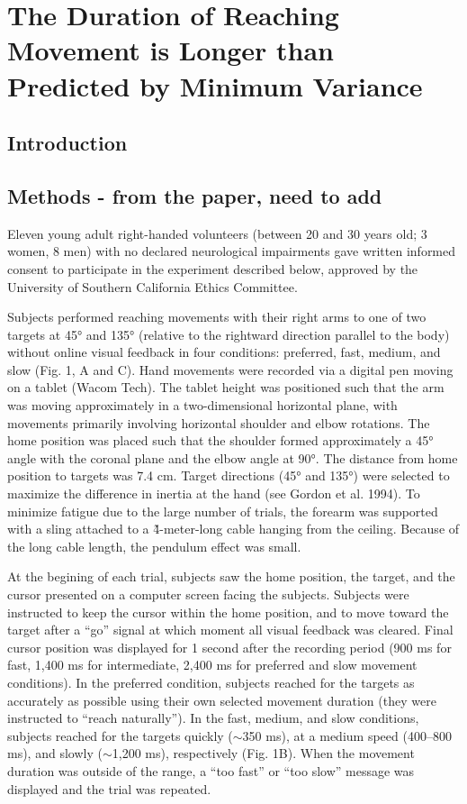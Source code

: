 \chapter{The Duration of Reaching Movement is Longer than Predicted by Minimum Variance}
\label{cha:md}

\section{Introduction}

\section{Methods - from the paper, need to add}
Eleven young adult right-handed volunteers (between 20 and 30 years old; 3 women, 8 men) with no declared neurological impairments gave written informed consent to participate in the experiment described below, approved by the University of Southern California Ethics Committee.

Subjects performed reaching movements with their right arms to one of two targets at 45° and 135° (relative to the rightward direction parallel to the body) without online visual feedback in four conditions: preferred, fast, medium, and slow (Fig. 1, A and C).  
Hand movements were recorded via a digital pen moving on a tablet (Wacom Tech). 
The tablet height was positioned such that the arm was moving approximately in a two-dimensional horizontal plane, with movements primarily involving horizontal shoulder and elbow rotations. 
The home position was placed such that the shoulder formed approximately a 45° angle with the coronal plane and the elbow angle at 90°. 
The distance from home position to targets was 7.4 cm. 
Target directions (45° and 135°) were selected to maximize the difference in inertia at the hand (see Gordon et al. 1994). 
To minimize fatigue due to the large number of trials, the forearm was supported with a sling attached to a \~4-meter-long cable hanging from the ceiling. 
Because of the long cable length, the pendulum effect was small.

At the begining of each trial, subjects saw the home position, the target, and the cursor presented on a computer screen facing the subjects. 
Subjects were instructed to keep the cursor within the home position, and to move toward the target after a “go” signal at which moment all visual feedback was cleared. 
Final cursor position was displayed for 1 second after the recording period (900 ms for fast, 1,400 ms for intermediate, 2,400 ms for preferred and slow movement conditions). 
In the preferred condition, subjects reached for the targets as accurately as possible using their own selected movement duration (they were instructed to “reach naturally”). 
In the fast, medium, and slow conditions, subjects reached for the targets quickly ($\sim$350 ms), at a medium speed (400--800 ms), and slowly ($\sim$1,200 ms), respectively (Fig. 1B). 
When the movement duration was outside of the range, a “too fast” or “too slow” message was displayed and the trial was repeated. 

